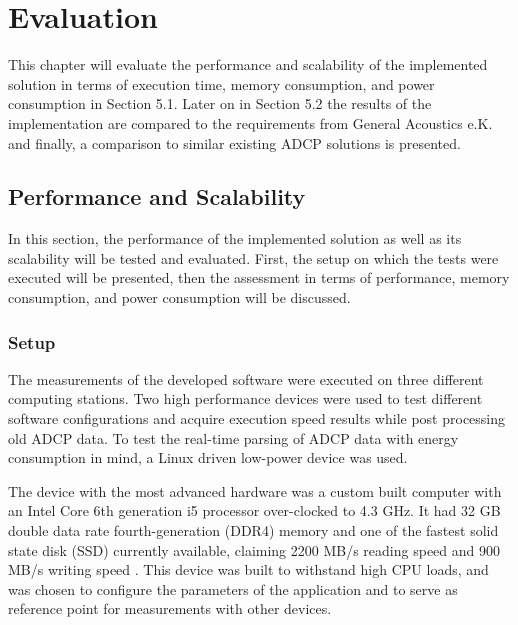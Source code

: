 \chapter{Evaluation}
This chapter will evaluate the performance and scalability of the implemented solution in terms of execution time, memory consumption, and power consumption in Section 5.1. Later on in Section 5.2 the results of the implementation are compared to the requirements from General Acoustics e.K. and finally, a comparison to similar existing ADCP solutions is presented.

\section{Performance and Scalability}
In this section, the performance of the implemented solution as well as its scalability will be tested and evaluated. First, the setup on which the tests were executed will be presented, then the assessment in terms of performance, memory consumption, and power consumption will be discussed. 
\subsection{Setup}
The measurements of the developed software were executed on three different computing stations. Two high performance devices were used to test different software configurations and acquire execution speed results while post processing old ADCP data. To test the real-time parsing of ADCP data with energy consumption in mind, a Linux driven low-power device was used.

The device with the most advanced hardware was a custom built computer with an Intel Core 6th generation i5 processor \cite{i5} over-clocked to 4.3 GHz. It had 32 GB double data rate fourth-generation (DDR4) memory \cite{ddr4} and one of the fastest solid state disk (SSD) currently available, claiming 2200 MB/s reading speed and 900 MB/s writing speed \cite{ssd}. This device was built to withstand high CPU loads, and was chosen to configure the parameters of the application and to serve as reference point for measurements with other devices.

